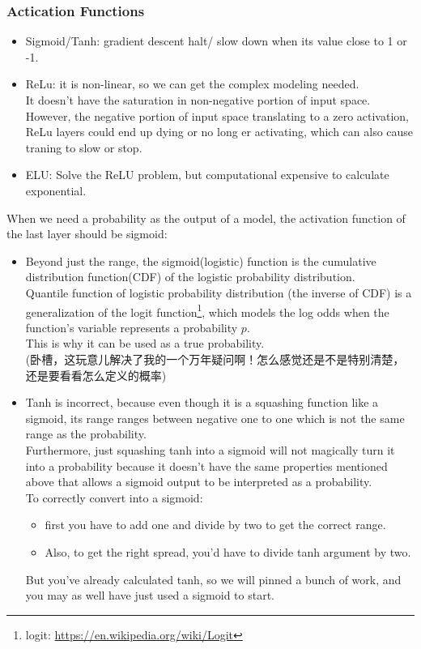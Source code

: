 \subsubsection{Actication Functions}
\begin{itemize}
	\item Sigmoid/Tanh: gradient descent halt/ slow down when its value close to 1 or -1.
	\item ReLu: it is non-linear, so we can get the complex modeling needed.\\
	It doesn't have the saturation in non-negative portion of input space.\\
	However, the negative portion of input space translating to a zero activation, ReLu layers could end up dying or no long er activating, which can also cause traning to slow or stop.
	\item ELU: Solve the ReLU problem, but computational expensive to calculate exponential.
	
\end{itemize}
When we need a probability as the output of a model, the activation function of the last layer should be sigmoid: 
\begin{itemize}
	\item  Beyond just the range, the sigmoid(logistic) function is the cumulative distribution function(CDF) of the logistic probability distribution.\\
	Quantile function of logistic probability distribution (the inverse of CDF) is a generalization of the logit function\footnote{logit: \url{https://en.wikipedia.org/wiki/Logit}}, which models the log odds when the function's variable represents a probability $ p $.\\
	This is why it can be used as a true probability.\\
	(卧槽，这玩意儿解决了我的一个万年疑问啊！怎么感觉还是不是特别清楚，还是要看看怎么定义的概率)
	\item  Tanh is incorrect, because even though it is a squashing function like a sigmoid, its range ranges between negative one to one which is not the same range as the probability. \\
	Furthermore, just squashing tanh into a sigmoid will not magically turn it into a probability because it doesn't have the same properties mentioned above that allows a sigmoid output to be interpreted as a probability.\\
	To correctly convert into a sigmoid:
	\begin{itemize}
		\item first you have to add one and divide by two to get the correct range.
		\item Also, to get the right spread, you'd have to divide tanh argument by two. 
	\end{itemize} 
	But you've already calculated tanh, so we will pinned a bunch of work, and you may as well have just used a sigmoid to start.
\end{itemize}

 